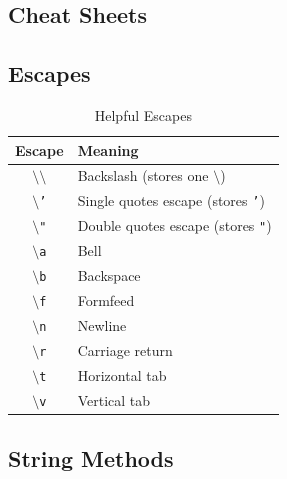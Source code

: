 \documentclass[a4paper,11pt]{book}
\begin{document}
\begin{appendices}
\appendixpage
\noappendicestocpagenum
\addappheadtotoc

\chapter{Cheat Sheets}
\label{app:cheatsheets}

\section{Escapes}

\begin{table}[!htbp]
\centering
\caption{Helpful Escapes}
\label{tab:helpful_escapes}
	\begin{tabular}{cl}
		\toprule \toprule
		Escape & Meaning \\
		\midrule
		\texttt{$\setminus\setminus$} & Backslash (stores one $\setminus$) \\
		\texttt{$\setminus$'} & Single quotes escape (stores \texttt{'})\\
		\texttt{$\setminus$"} & Double quotes escape (stores \texttt{"})\\
		\texttt{$\setminus$a} & Bell \\
		\texttt{$\setminus$b} & Backspace \\
		\texttt{$\setminus$f} & Formfeed \\
		\texttt{$\setminus$n} & Newline \\
		\texttt{$\setminus$r} & Carriage return \\
		\texttt{$\setminus$t} & Horizontal tab \\
		\texttt{$\setminus$v} & Vertical tab \\
		\bottomrule
	\end{tabular}
\end{table}
\clearpage

\section{String Methods}


\end{appendices}
\end{document}
